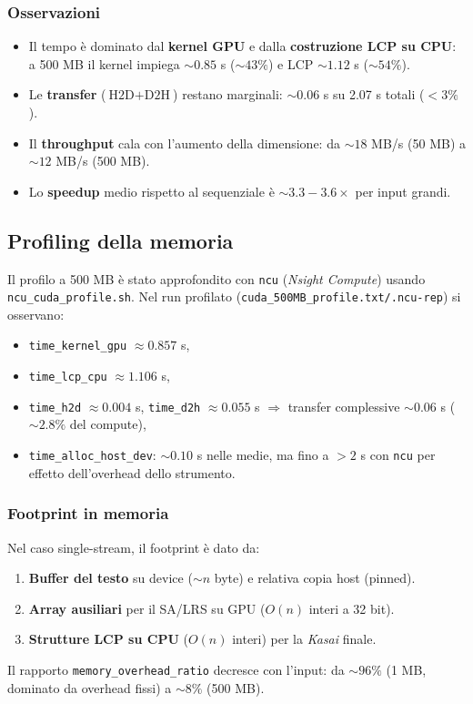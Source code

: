 			\subsubsection*{Osservazioni}
				\begin{itemize}
						\item Il tempo è dominato dal \textbf{kernel GPU} e dalla \textbf{costruzione LCP su CPU}: a 500 MB il kernel impiega \(\sim 0.85\) s (\(\sim 43\%\)) e LCP \(\sim 1.12\) s (\(\sim 54\%\)).
						\item Le \textbf{transfer} (\(\text{H2D}+\text{D2H}\)) restano marginali: \(\sim 0.06\) s su 2.07 s totali (\(<3\%\)).
						\item Il \textbf{throughput} cala con l’aumento della dimensione: da \(\sim 18\) MB/s (50 MB) a \(\sim 12\) MB/s (500 MB).
						\item Lo \textbf{speedup} medio rispetto al sequenziale è \(\sim 3.3{-}3.6\times\) per input grandi.
				\end{itemize}
		
		\subsection{Profiling della memoria}
			Il profilo a 500 MB è stato approfondito con \texttt{ncu} (\textit{Nsight Compute}) usando \texttt{ncu\_cuda\_profile.sh}.
			Nel run profilato (\texttt{cuda\_500MB\_profile.txt/.ncu-rep}) si osservano:
			\begin{itemize}
				\item \texttt{time\_kernel\_gpu} \(\approx 0.857\) s,
				\item \texttt{time\_lcp\_cpu} \(\approx 1.106\) s,
				\item \texttt{time\_h2d} \(\approx 0.004\) s, \texttt{time\_d2h} \(\approx 0.055\) s \(\Rightarrow\) transfer complessive \(\sim 0.06\) s (\(\sim 2.8\%\) del compute),
				\item \texttt{time\_alloc\_host\_dev}: \(\sim 0.10\) s nelle medie, ma fino a \(>2\) s con \texttt{ncu} per effetto dell’overhead dello strumento.
			\end{itemize}
			
			\subsubsection*{Footprint in memoria}
				Nel caso single-stream, il footprint è dato da:
				\begin{enumerate}
						\item \textbf{Buffer del testo} su device (\(\sim n\) byte) e relativa copia host (pinned).
						\item \textbf{Array ausiliari} per il SA/LRS su GPU (\(O(n)\) interi a 32 bit).
						\item \textbf{Strutture LCP su CPU} (\(O(n)\) interi) per la \emph{Kasai} finale.
				\end{enumerate}
				Il rapporto \texttt{memory\_overhead\_ratio} decresce con l’input: da \(\sim 96\%\) (1 MB, dominato da overhead fissi) a \(\sim 8\%\) (500 MB).
				
